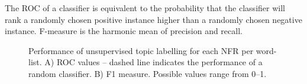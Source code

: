 \documentclass[]{sig-alternate}
\begin{document}
The %
ROC of a classifier is equivalent to the probability that the classifier will rank a randomly chosen positive instance higher than a randomly chosen negative instance.
F-measure is the harmonic mean of precision and recall.


\begin{figure}[]
\centering
{}
\caption[]{Performance of unsupervised topic labelling for each NFR per word-list. A) ROC values -- dashed line indicates the performance of a random classifier. B) F1 measure. Possible values range from 0--1.
}
\label{fig:maxdb-unsup-results}
\end{figure}


\end{document}
